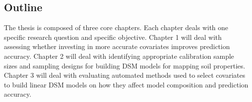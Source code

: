 \subsection{Outline}

The thesis is composed of three core chapters. Each chapter deals with one specific 
research question and specific objective. Chapter 1 will deal with assessing 
whether investing in more accurate covariates improves prediction accuracy. 
Chapter 2 will deal with identifying appropriate calibration sample sizes and 
sampling designs for building DSM models for mapping soil properties. Chapter 3 
will deal with evaluating automated methods used to select covariates to build 
linear DSM models on how they affect model composition and prediction accuracy.
